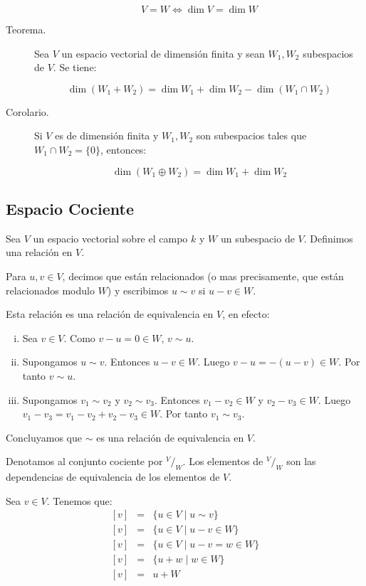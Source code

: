 \documentclass[12pt]{article}
\begin{document}
\begin{description}
\begin{equation}
V = W \Leftrightarrow \dim{V} = \dim{W}
\end{equation}

\item [Teorema.] Sea $V$ un espacio vectorial de dimensión finita y sean $W_1, W_2$ subespacios de $V$. Se tiene:

\begin{equation}
\dim{(W_1 + W_2)} = \dim{W_1} + \dim{W_2} - \dim{(W_1 \cap W_2)}
\end{equation}

\item [Corolario.] Si $V$ es de dimensión finita y $W_1, W_2$ son subespacios tales que $W_1 \cap W_2 = \{ 0 \}$, entonces:

\begin{equation}
\dim{(W_1 \oplus W_2)} = \dim{W_1} + \dim{W_2}
\end{equation}
\end{description}

\subsection{Espacio Cociente}
Sea $V$ un espacio vectorial sobre el campo $k$ y $W$ un subespacio de $V$. Definimos una relación en $V$.

Para $u, v \in V$, decimos que están relacionados (o mas precisamente, que están relacionados modulo $W$) y escribimos $u \sim v$ si $u - v \in W$.

Esta relación es una relación de equivalencia en $V$, en efecto:

\begin{enumerate}[i)]
\item Sea $v \in V$. Como $v - u = 0 \in W$, $v \sim u$.
\item Supongamos $u \sim v$. Entonces $u - v \in W$. Luego $v - u = -(u - v) \in W$. Por tanto $v \sim u$.
\item Supongamos $v_1 \sim v_2$ y $v_2 \sim v_3$. Entonces $v_1 - v_2 \in W$ y $v_2 - v_3 \in W$. Luego $v_1 - v_3 = v_1 - v_2 + v_2 - v_3 \in W$. Por tanto $v_1 \sim v_3$.
\end{enumerate}

Concluyamos que $\sim$ es una relación de equivalencia en $V$.

Denotamos al conjunto cociente por $^V/_W$. Los elementos de $^V/_W$ son las dependencias de equivalencia de los elementos de $V$.

Sea $v \in V$. Tenemos que:
\begin{eqnarray}
\left[ v \right] & = & \{ u \in V \mid u \sim v \}        \nonumber \\
\left[ v \right] & = & \{ u \in V \mid u - v \in W \}     \nonumber \\
\left[ v \right] & = & \{ u \in V \mid u - v = w \in W \} \nonumber \\
\left[ v \right] & = & \{ u + w   \mid w \in W \}         \nonumber \\
\left[ v \right] & = & u + W
\end{eqnarray}
\end{document}
